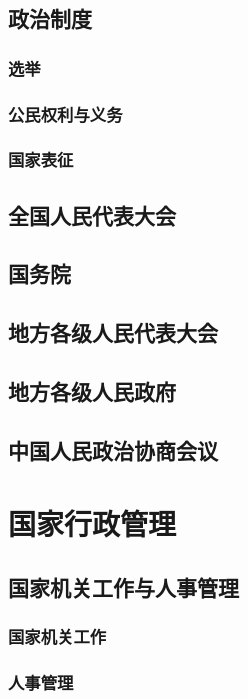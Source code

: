 \documentclass[UTF8]{../RepresentationUniverse}
\begin{document}
    \subsection{政治制度}
        \subsubsection{选举}
        \subsubsection{公民权利与义务}
        \subsubsection{国家表征}
        
    \subsection{全国人民代表大会}
    \subsection{国务院}
    \subsection{地方各级人民代表大会}
    \subsection{地方各级人民政府}
    \subsection{中国人民政治协商会议}



\section{国家行政管理}
\subsection{国家机关工作与人事管理}
    \subsubsection{国家机关工作}
    \subsubsection{人事管理}
\end{document}
